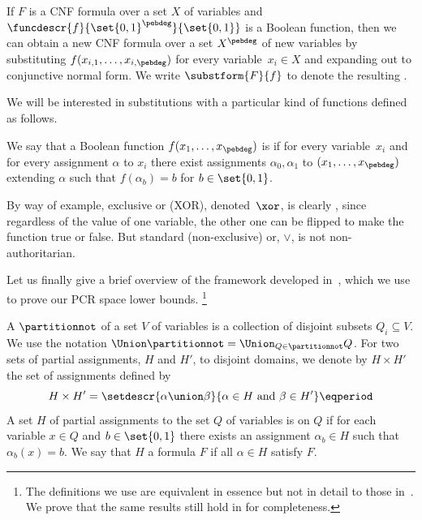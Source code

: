 \documentclass{toc}
\begin{document}
%
%
%
%
%
%
%
%

\begin{definition}
  \label{def:substituted-formula}
If $F$ is a CNF formula over a set %
$X$ of variables  %
and
$\funcdescr{f}{\set{0, 1}^{\pebdeg}}{\set{0, 1}}$
is a Boolean function, then 
we can obtain a new CNF formula over a set
%
$X^{\pebdeg}$ of new variables  %
by
%
substituting $f(x_{i,1}, \ldots, x_{i,\pebdeg})$ for every variable~$x_i\in X$
%
%
%
%
and expanding out to conjunctive normal form. We write 
$\substform{F}{f}$   %
%
to denote the resulting . %
\end{definition}
We will be
interested in substitutions with a
particular kind of functions defined as follows.

\begin{definition}
  \label{def:nonauth-func}
  We say that
  a Boolean function $f(x_1, \ldots, x_{\pebdeg})$ is
  \introduceterm{\nonauthor{}} if for every
  variable~$x_i$ %
  and for every
  assignment $\alpha$ to
  $x_i$ there exist %
%
assignments  %
$\alpha_0, \alpha_1$
to $(x_1,\dots,x_{\pebdeg})$   %
%
%
%
%
extending $\alpha$ such that $f(\alpha_b) = b$ for $b \in \set{0, 1}$.
\end{definition}

By way of example, exclusive or (XOR), denoted~$\xor$, 
is clearly \nonauthor, since regardless of the
value of one variable, the other one can be flipped to make the
function true or false.  %
%
But standard (non-exclusive) or, $\lor$, is not non-authoritarian.  %
%
%
%
%

%
%
Let us finally give a brief overview of the framework developed
in~\cite{BG15Framework},
which we use to prove our PCR space lower bounds.%
%
%
%
%
%
%
\footnote{The definitions we use are equivalent in essence but not in detail to those in~\cite{BG15Framework}.
%
%
%
%
We prove that the same results still hold in
%
%
    for completeness.}

A 
$\partitionnot$ of a
%
set $V$ of variables  %
is a collection of disjoint %
subsets  %
$Q_i\subseteq V$. 
We use the notation $\Union \partitionnot =
%
%
\Union_{Q\in\partitionnot} Q$. %
For two sets of partial
assignments, $H$ and $H'$, %
to disjoint domains, we denote by $H \times H'$ the set of 
assignments %
%
%
%
defined by \[ H \times H' = \setdescr{\alpha \union
  \beta}{\alpha \in H \text{\ and\ } \beta \in H'} \eqperiod\] %
A set %
$H$ of partial assignments  %
to the %
%
set $Q$ of variables  %
is
\introduceterm{\flippable{}} on $Q$ if for each
variable $x \in Q$ and $b \in \set{0, 1}$ there exists an assignment
$\alpha_b \in H$ such that $\alpha_b(x) = b$. 
%
We say that
$H$  a formula $F$ if all 
$\alpha \in H$
%
satisfy $F$.
\end{document}

